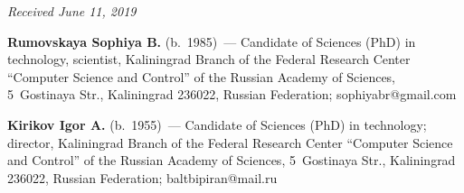 
\hfill{\small\textit{Received June 11, 2019}}


 
   
   
   
   \Contr
   
\noindent
\textbf{Rumovskaya Sophiya B.} (b.\ 1985)~--- Candidate of Sciences (PhD) in 
technology, scientist, Kaliningrad Branch of the Federal Research Center 
``Computer Science and Control'' of the Russian Academy of Sciences, 5~Gostinaya 
Str., Kaliningrad 236022, Russian Federation; \mbox{sophiyabr@gmail.com}

\vspace*{3pt}

\noindent
\textbf{Kirikov Igor A.} (b.\ 1955)~--- Candidate of Sciences (PhD) in 
technology; director, Kaliningrad Branch of the Federal Research Center 
``Computer Science and Control'' of the Russian Academy of Sciences, 5~Gostinaya 
Str., Kaliningrad 236022, Russian Federation; \mbox{baltbipiran@mail.ru} 
\label{end\stat}

\renewcommand{\bibname}{\protect\rm Литература}
    